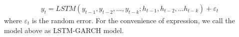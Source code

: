  \begin{eqnarray}
    {y_{t}} = LSTM(y_{t-1},y_{t-2},...,y_{t-k};h_{t-1},h_{t-2},...h_{t-k}) + \varepsilon_t
\end{eqnarray}
where $\varepsilon_t$ is the random error. For the convenience of expression, we call the model above as LSTM-GARCH model. 




 
